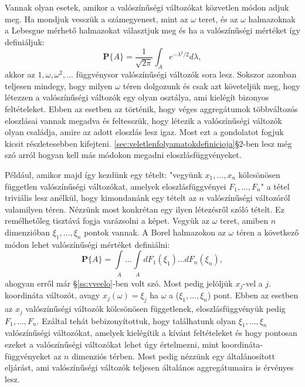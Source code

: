 \documentclass{article}
\begin{document}
Vannak olyan esetek, amikor a valószínűségi változókat közvetlen módon adjuk meg. Ha mondjuk vesszük a számegyenest, mint az $\omega$ teret, és az $\omega$ halmazoknak a Lebesgue mérhető halmazokat választjuk meg és ha a valószínűségi mértéket így definiáljuk:
\begin{equation}
 \mathrm{\textbf{P}}\{ A \} = \frac{1}{\sqrt{2\pi}} \int_{A} e^{-\lambda^2/2}d\lambda,
\end{equation}
akkor az $1,\omega,\omega^2,\ldots$ függvénysor valószínűségi változók sora lesz. Sokszor azonban teljesen mindegy, hogy milyen $\omega$ téren dolgozunk és csak azt követeljük meg, hogy létezzen a valószínűségi változók egy olyan osztálya, ami kielégít bizonyos feltételeket. Ebben az esetben az történik, hogy véges aggregátumok többváltozós eloszlásai vannak megadva és feltesszük, hogy létezik a valószínűségi változók olyan családja, amire az adott eloszlás lesz igaz. Most ezt a gondolatot fogjuk kicsit részletesebben kifejteni. \ref{sec:veletlenfolyamatokdefinicioja}§2-ben lesz még szó arról hogyan kell más módokon megadni eloszlásfüggvényeket.

Például, amikor majd így kezdünk egy tételt: "vegyünk $x_1,\ldots,x_n$ kölcsönösen független valószínűségi változókat, amelyek eloszlásfüggvényei $F_1,\ldots,F_n$" a tétel triviális lesz anélkül, hogy kimondanánk egy tételt az $n$ valószínűségi változóról valamilyen téren. Nézzünk most konkrétan egy ilyen létezésről szóló tételt. Ez remélhetőleg tisztává fogja varázsolni a képet. Vegyük az $\omega$ teret, amiben $n$ dimenzióban $\xi_1,\ldots,\xi_n$ pontok vannak. A Borel halmazokon az $\omega$ téren a következő módon lehet valószínűségi mértéket definiálni: 
\begin{equation}
	\mathrm{\textbf{P}}\{ A \} = \int\limits_{\substack{A}} \ldots \int\limits_{\substack{A}}  dF_1(\xi_1) \ldots dF_n(\xi_n),
\end{equation}
ahogyan erről már §\ref{ss:vveelo}-ben volt szó. Most pedig jelöljük $x_j$-vel a $j$. koordináta változót, avagy $x_j(\omega)=\xi_j$ ha $\omega$ a ($\xi_1,\ldots,\xi_n$) pont. Ebben az esetben az $x_j$ valószínűségi változók kölcsönösen függetlenek, eloszlásfüggvényük pedig $F_1,\ldots,F_n$. Ezáltal tehát bebizonyítottuk, hogy találhatunk olyan $\xi_1,\ldots,\xi_n$ valószínűségi változókat, amelyek kielégítik a kívánt feltételeket és hogy pontosan ezeket a valószínűségi változókat lehet úgy értelmezni, mint koordináta-függvényeket az $n$ dimenziós térben. Most pedig nézzünk egy általánosított eljárást, ami valószínűségi változók teljesen általános aggregátumaira is érvényes lesz. 
\end{document}
